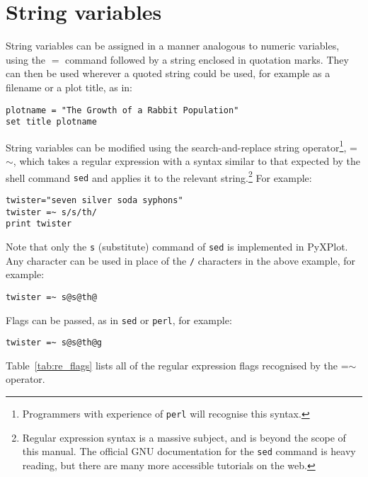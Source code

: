 \section{String variables}
\label{sect:stringvars}

String variables can be assigned in a manner analogous to numeric variables,
using the $=$ command followed by a string enclosed in quotation marks. They can
then be used wherever a quoted string could be used, for example as a filename
or a plot title, as in:

\begin{verbatim}
plotname = "The Growth of a Rabbit Population"
set title plotname
\end{verbatim}

String variables can be modified using the search-and-replace string
operator\footnote{Programmers with
experience of {\tt perl} will recognise this syntax.}, =$\sim$, which takes a regular expression with a syntax similar to that
expected by the shell command {\tt sed} and applies it to the relevant string.\footnote{Regular expression
syntax is a massive subject, and is beyond the scope of this manual. The
official GNU documentation for the {\tt sed} command is heavy reading, but
there are many more accessible tutorials on the web.} For example:

\begin{verbatim}
twister="seven silver soda syphons"
twister =~ s/s/th/
print twister
\end{verbatim}

Note that only the {\tt s} (substitute) command of {\tt sed} is implemented in
PyXPlot. Any character can be used in place of the {\tt /} characters in the
above example, for example:

\begin{verbatim}
twister =~ s@s@th@
\end{verbatim}

\noindent Flags can be passed, as in {\tt sed} or {\tt perl}, for example:

\begin{verbatim}
twister =~ s@s@th@g
\end{verbatim}

\noindent Table~\ref{tab:re_flags} lists all of the regular expression flags
recognised by the =$\sim$ operator.

